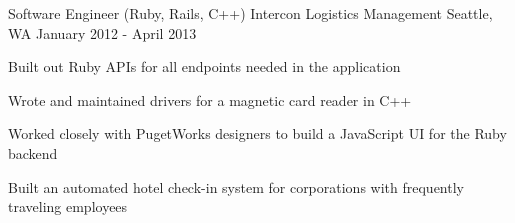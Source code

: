 \begin{cventries}
  \cventry
    {Software Engineer (Ruby, Rails, C++)} %
    {Intercon Logistics Management} %
    {Seattle, WA} %
    {January 2012 - April 2013} %
    {
      \begin{cvitems} %
        \item {Built out Ruby APIs for all endpoints needed in the application}
        \item {Wrote and maintained drivers for a magnetic card reader in C++}
        \item {Worked closely with PugetWorks designers to build a JavaScript UI for the Ruby backend}
        \item {Built an automated hotel check-in system for corporations with frequently traveling employees}
      \end{cvitems}
    }

\end{cventries}
